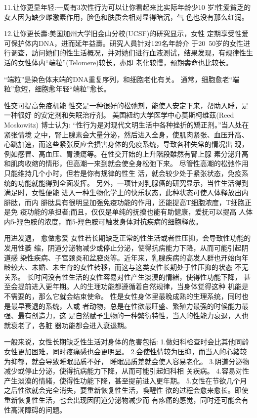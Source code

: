 \documentclass[12pt,UTF8]{ctexbook}
\begin{document}
11.让你更显年轻:一周有3次性行为可以让你看起来比实际年龄少10
岁!性爱貧乏的女人因为缺少雌激素作用，脸色和肤质会相对显得暗沉，气
色也没有那么红润。

12.让你更长壽:美国加州大学旧金山分校(UCSF)的研究显示，女性
定期享受性爱可保护体内DNA，进而延年益壽。研究人員针对129名年龄介
于20~50岁的女性进行调查，訪问她们的性生活概况，并对她们进行血液測试，结果发现，有规律性生活的女性体内“端粒”(Telomere)较长，亦即
老化较慢，预期壽命也比较长。

“端粒”是染色体末端的DNA重复序列，和细胞老化有关。
通常，细胞愈老“端粒”愈短，细胞愈年轻“端粒”愈长。

性交可提高免疫机能
性交是一种很好的松弛剂，能使人安定下来，帮助入睡，是一种很好
的安定剂和失眠治疗剂。
美国紐约大学医学中心莫斯柯维茲(Reed Moskowitz) 博士认为:
“性行为是对现代文明生活中各种挫折的矯正剂。”当人处在紧张情境
之中，腎上腺素会大量分泌，然后进入全身，使肌肉紧张、血压升高、心跳加速，而这些紧张反应会損害身体的免疫系统，导致各种失常的情况出
现，例如感冒、高血压、胃溃瘍等。在性交开始的上升階段雖然有腎上腺
素分泌升高和肌肉收缩的情形，但高潮一来到就会使全身松弛下来。
尽管性高潮的松弛作用只能维持几个小时，但若是你有规律的性生
活，就会较少处于紧张状态，免疫系统的功能就能得到全面发挥。
另外，一项针对乳腺癌的研究显示，当性生活得到满足时，女性便能
进入一种生物化学上的快乐状态，此种状态可使人体释放出内腓肽，而内
腓肽具有很明显加强免疫功能的作用，还能提高T细胞浓度，T细胞正是免
疫功能的承担者;而且，仅仅是单纯的抚摸也能有助健康，爱抚可以提高
人体内5-羥色胺的浓度，而5-羥色胺可触发身体对抗疾病的细胞释放。

用进发退，
愈做愈爱
女性若长期缺乏正常的性生活或者性压抑，会导致性功能的发用性萎
缩，阴道分泌物减少或停止分泌，使得抗病能力下降，从而可能引起阴道感
染性疾病、子宫颈炎和盆腔炎等。近年来，乳腺疾病的高发人群也开始向年
龄较大、未婚、未生育的女性转移，而这与这类女性长期处于性压抑的状态
不无关系。
长时间没有性生活的女性容易对性产生淡漠的情緒，使得性功能下降，
甚至会提前进入更年期。人的生理功能都遵循着自然规律，当身体觉得这种
机能是不需要的，那么它就会结束使命。
性是女性身体里最晚成熟的生理系统，同时也是最早衰退的系统，人或
者动物，总是在性欲最旺盛、繁殖力最强的时候能力最强、最有创造力，这
是自然赋予生物的一种繁衍特性，当人的性能力衰退，人也就衰老了，各脏
器功能都会进入衰退期。

一般来说，女性长期缺乏性生活对身体的危害包括:
1.做妇科检查时会比其他同龄女性更加困难，同时疼痛感也会更明显。
2.会使性情较为压抑，而当人的心緒较为抑郁，就会导致睡眠品质不好，
睡眠品质差就会使人容易老化。
3.阴道分泌物减少或停止分泌，使得抗病能力下降，从而可能引起妇科相
关疾病。
4.容易对性产生淡漠的情緒，使得性功能下降，甚至提前进入更年期。
5.女性在节欲几个月之后性欲就会完全消失，要重新恢复性生活，喚醒性
欲的过程会愈来愈长。即使重新恢复性生活，也会出现因阴道分泌物减少而
有疼痛的感觉，同时还可能会有性高潮障碍的问题。
\end{document}
